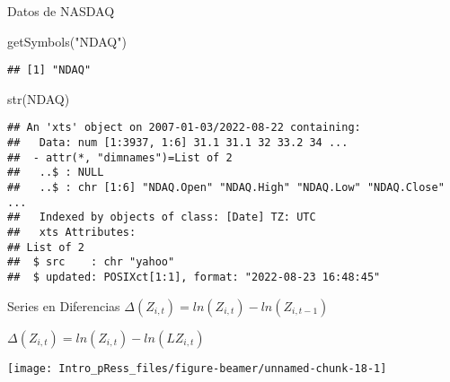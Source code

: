 \documentclass[
  10,
  ignorenonframetext,
]{beamer}
\newenvironment{Shaded}{\begin{snugshade}}{\end{snugshade}}
\newcommand{\FunctionTok}[1]{\textcolor[rgb]{0.00,0.00,0.00}{#1}}
\newcommand{\NormalTok}[1]{#1}
\newcommand{\OtherTok}[1]{\textcolor[rgb]{0.56,0.35,0.01}{#1}}
\newcommand{\SpecialCharTok}[1]{\textcolor[rgb]{0.00,0.00,0.00}{#1}}
\newcommand{\StringTok}[1]{\textcolor[rgb]{0.31,0.60,0.02}{#1}}
\begin{document}
\begin{frame}[fragile]{Datos de NASDAQ}
\protect\hypertarget{datos-de-nasdaq}{}
\begin{Shaded}
\begin{Highlighting}[]
\FunctionTok{getSymbols}\NormalTok{(}\StringTok{"NDAQ"}\NormalTok{)}
\end{Highlighting}
\end{Shaded}

\begin{verbatim}
## [1] "NDAQ"
\end{verbatim}

\begin{Shaded}
\begin{Highlighting}[]
\FunctionTok{str}\NormalTok{(NDAQ)}
\end{Highlighting}
\end{Shaded}

\begin{verbatim}
## An 'xts' object on 2007-01-03/2022-08-22 containing:
##   Data: num [1:3937, 1:6] 31.1 31.1 32 33.2 34 ...
##  - attr(*, "dimnames")=List of 2
##   ..$ : NULL
##   ..$ : chr [1:6] "NDAQ.Open" "NDAQ.High" "NDAQ.Low" "NDAQ.Close" ...
##   Indexed by objects of class: [Date] TZ: UTC
##   xts Attributes:  
## List of 2
##  $ src    : chr "yahoo"
##  $ updated: POSIXct[1:1], format: "2022-08-23 16:48:45"
\end{verbatim}
\end{frame}

\begin{frame}[fragile]{Series en Diferencias}
\protect\hypertarget{series-en-diferencias}{}
\(\Delta(Z_{i,t}) = ln(Z_{i,t})-ln(Z_{i,t-1})\)

\(\Delta(Z_{i,t}) = ln(Z_{i,t})-ln(LZ_{i,t})\)

\begin{Shaded}
\end{Shaded}

\texttt{[image: Intro\_pRess\_files/figure-beamer/unnamed-chunk-18-1]}
\end{frame}
\end{document}
